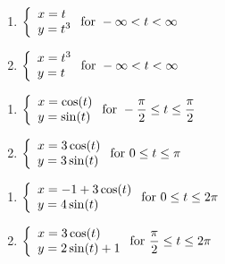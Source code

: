 \begin{multicols}{2} \raggedcolumns 
\begin{enumerate}
\setcounter{enumi}{\value{HW}}

\item ${\displaystyle \left\{ \begin{array}{l} x = t \\ y = t^3 \end{array} \right. \vspace{.25in} \mbox{for } -\infty < t < \infty}$
\item ${\displaystyle \left\{ \begin{array}{l} x = t^3 \\ y = t \end{array} \right. \vspace{.25in} \mbox{for } -\infty < t < \infty}$

\setcounter{HW}{\value{enumi}}
\end{enumerate}
\end{multicols}

\begin{multicols}{2} \raggedcolumns 
\begin{enumerate}
\setcounter{enumi}{\value{HW}}
\item ${\displaystyle \left\{ \begin{array}{l} x = \cos(t) \\ y = \sin(t) \end{array} \right. \vspace{.25in} \mbox{for } -\dfrac{\pi}{2} \leq t \leq \dfrac{\pi}{2}}$
\item ${\displaystyle \left\{ \begin{array}{l} x = 3\cos(t) \\ y = 3\sin(t) \end{array} \right. \vspace{.25in} \mbox{for } 0 \leq t \leq \pi}$


\setcounter{HW}{\value{enumi}}
\end{enumerate}
\end{multicols}



\begin{multicols}{2} \raggedcolumns 
\begin{enumerate}
\setcounter{enumi}{\value{HW}}

\item ${\displaystyle \left\{ \begin{array}{l} x = -1+ 3\cos(t) \\ y = 4\sin(t) \end{array} \right. \vspace{.25in} \mbox{for } 0 \leq t \leq 2\pi}$
\item ${\displaystyle \left\{ \begin{array}{l} x = 3\cos(t) \\ y = 2\sin(t)+1 \end{array} \right. \vspace{.25in} \mbox{for } \dfrac{\pi}{2} \leq t \leq 2\pi}$

\setcounter{HW}{\value{enumi}}
\end{enumerate}
\end{multicols}

